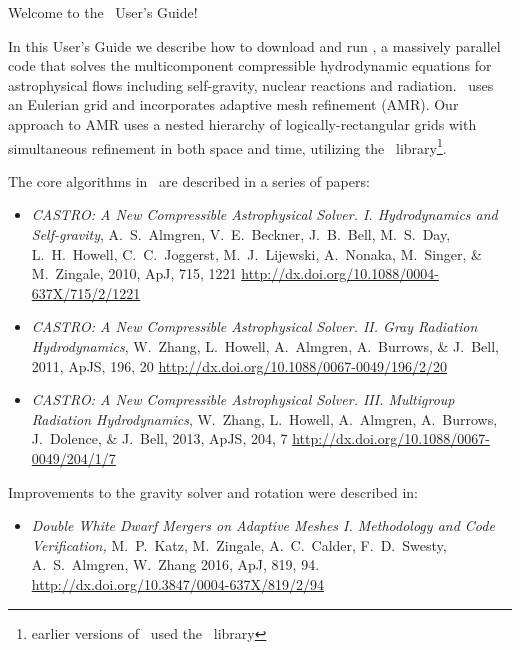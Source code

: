 Welcome to the \castro\ User's Guide!

In this User's Guide we describe how to download and run \castro, a
massively parallel code that solves the multicomponent compressible
hydrodynamic equations for astrophysical flows including self-gravity,
nuclear reactions and radiation.  \castro\ uses an Eulerian grid and
incorporates adaptive mesh refinement (AMR).  Our approach to AMR uses
a nested hierarchy of logically-rectangular grids with simultaneous
refinement in both space and time, utilizing the
\amrex\ library\footnote{earlier versions of \castro\ used the
  \boxlib\ library}.

The core algorithms in \castro\ are described in a series of papers:
\begin{itemize}
\item {\it CASTRO: A New Compressible Astrophysical Solver. I. Hydrodynamics and Self-gravity},
  A.~S.~Almgren, V.~E.~Beckner, J.~B.~Bell, M.~S.~Day, L.~H.~Howell, C.~C.~Joggerst, M.~J.~Lijewski,
  A.~Nonaka, M.~Singer, \& M.~Zingale, 2010, ApJ, 715, 1221\newline
  \url{http://dx.doi.org/10.1088/0004-637X/715/2/1221}

\item {\it CASTRO: A New Compressible Astrophysical Solver. II. Gray Radiation Hydrodynamics},
  W.~Zhang, L.~Howell, A.~Almgren, A.~Burrows, \& J.~Bell, 2011, ApJS, 196, 20\newline
  \url{http://dx.doi.org/10.1088/0067-0049/196/2/20}

\item {\it CASTRO: A New Compressible Astrophysical Solver. III. Multigroup Radiation Hydrodynamics},
  W.~Zhang, L.~Howell, A.~Almgren, A.~Burrows, J.~Dolence, \& J.~Bell, 2013, ApJS, 204, 7\newline
  \url{http://dx.doi.org/10.1088/0067-0049/204/1/7}

\end{itemize}

Improvements to the gravity solver and rotation were described in:
\begin{itemize}
\item {\it Double White Dwarf Mergers on Adaptive Meshes I. Methodology
       and Code Verification, }
  M.~P.~Katz, M.~Zingale, A.~C.~Calder, F.~D.~Swesty, A.~S.~Almgren, W.~Zhang
  2016, ApJ, 819, 94.\newline
  \url{http://dx.doi.org/10.3847/0004-637X/819/2/94}
\end{itemize}

